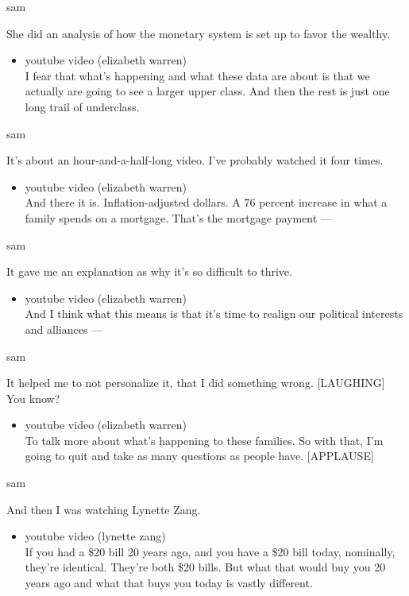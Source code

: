 sam

She did an analysis of how the monetary system is set up to favor the
wealthy.

\begin{itemize}
\tightlist
\item
  youtube video (elizabeth warren)\\
  I fear that what's happening and what these data are about is that we
  actually are going to see a larger upper class. And then the rest is
  just one long trail of underclass.
\end{itemize}

sam

It's about an hour-and-a-half-long video. I've probably watched it four
times.

\begin{itemize}
\tightlist
\item
  youtube video (elizabeth warren)\\
  And there it is. Inflation-adjusted dollars. A 76 percent increase in
  what a family spends on a mortgage. That's the mortgage payment ---
\end{itemize}

sam

It gave me an explanation as why it's so difficult to thrive.

\begin{itemize}
\tightlist
\item
  youtube video (elizabeth warren)\\
  And I think what this means is that it's time to realign our political
  interests and alliances ---
\end{itemize}

sam

It helped me to not personalize it, that I did something wrong.
{[}LAUGHING{]} You know?

\begin{itemize}
\tightlist
\item
  youtube video (elizabeth warren)\\
  To talk more about what's happening to these families. So with that,
  I'm going to quit and take as many questions as people have.
  {[}APPLAUSE{]}
\end{itemize}

sam

And then I was watching Lynette Zang.

\begin{itemize}
\tightlist
\item
  youtube video (lynette zang)\\
  If you had a \$20 bill 20 years ago, and you have a \$20 bill today,
  nominally, they're identical. They're both \$20 bills. But what that
  would buy you 20 years ago and what that buys you today is vastly
  different.
\end{itemize}

